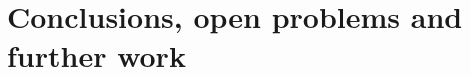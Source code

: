 \documentclass{article}
\newtheorem{prop}{Proposition}
\theoremstyle{definition}
\DeclareMathOperator{\internal}{\delta^i}
\DeclareMathOperator{\external}{\delta^e}
\DeclareMathOperator{\height}{ht}
\DeclareMathOperator{\width}{wt}
\newcommand{\KFr}{\textup{\textbf{KFr}}}
\newcommand{\PreO}{\textup{\textbf{PreO}}}
\newcommand{\Pos}{\textup{\textbf{Pos}}}
\newcommand{\lf}{\textit{lf}}
\begin{document}

\section{Conclusions, open problems and further work}
\label{sec:conclusions}

%

\end{document}
